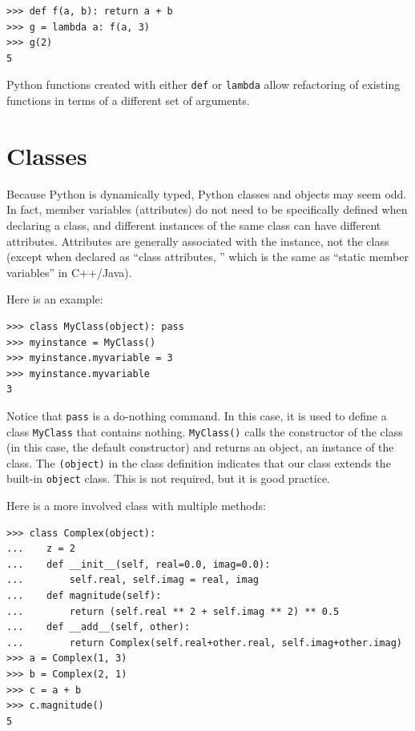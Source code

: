 \documentclass[justified, sixbynine]{tufte-book}
\def\ft{\small\tt}
\theoremstyle{plain}%
\newtheorem * {corollary}{Corollary}
\theoremstyle{definition}
\theoremstyle{remark}
\newtheorem * {remark}{Remark}
\newtheorem * {note}{Note}
\begin{document}
\begin{fullwidth}
\begin{lstlisting}
>>> def f(a, b): return a + b
>>> g = lambda a: f(a, 3)
>>> g(2)
5
\end{lstlisting}

Python functions created with either {\ft def} or {\ft lambda} allow refactoring of existing functions in terms of a different set of arguments.

\goodbreak\section{Classes}


Because Python is dynamically typed, Python classes and objects may seem odd. In fact, member variables (attributes) do not need to be specifically defined when declaring a class, and different instances of the same class can have different attributes. Attributes are generally associated with the instance, not the class (except when declared as ``class attributes, '' which is the same as ``static member variables'' in C++/Java).

Here is an example:

\begin{lstlisting}
>>> class MyClass(object): pass
>>> myinstance = MyClass()
>>> myinstance.myvariable = 3
>>> myinstance.myvariable
3
\end{lstlisting}

Notice that {\ft pass} is a do-nothing command. In this case, it is used to define a class {\ft MyClass} that contains nothing. {\ft MyClass()} calls the constructor of the class (in this case, the default constructor) and returns an object, an instance of the class. The {\ft (object)} in the class definition indicates that our class extends the built-in {\ft object} class. This is not required, but it is good practice.


Here is a more involved class with multiple methods:
\begin{lstlisting}
>>> class Complex(object):
...    z = 2
...    def __init__(self, real=0.0, imag=0.0):
...        self.real, self.imag = real, imag
...    def magnitude(self):
...        return (self.real ** 2 + self.imag ** 2) ** 0.5
...    def __add__(self, other):
...        return Complex(self.real+other.real, self.imag+other.imag)
>>> a = Complex(1, 3)
>>> b = Complex(2, 1)
>>> c = a + b
>>> c.magnitude()
5
\end{lstlisting}


\end{fullwidth}
\end{document}

